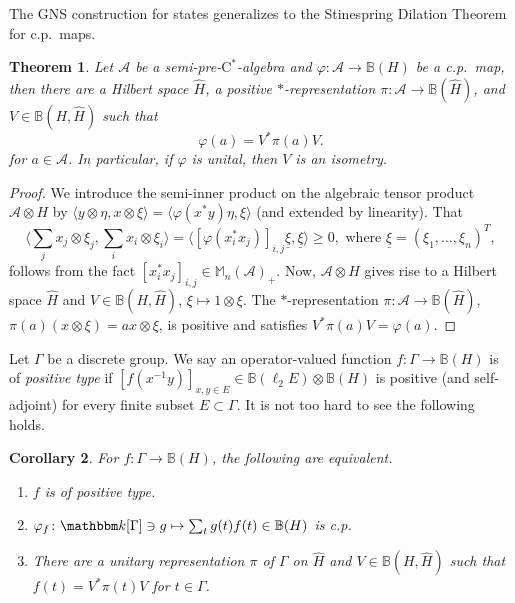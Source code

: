 \documentclass[12pt]{amsart}
\newtheorem{thm}{Theorem}
\newtheorem{cor}[thm]{Corollary}
\theoremstyle{definition}
\begin{document}
The GNS construction for states generalizes to
the Stinespring Dilation Theorem for c.p.\ maps.
\begin{thm}\label{thm:stinespring}
Let ${{\mathcal A}}$ be a {semi-pre-$\mathrm{C}^*$-alge\-bra\xspace} and
${\varphi}\colon{{\mathcal A}}\to{{\mathbb B}}({H})$ be a c.p.\ map,
then there are a Hilbert space $\hat{H}$, a positive {$*$-repre\-sen\-ta\-tion\xspace}
$\pi\colon{{\mathcal A}}\to{{\mathbb B}}(\hat{H})$, and $V\in{{\mathbb B}}({H},\hat{H})$ such that
\[
{\varphi}(a)=V^*\pi(a)V.
\]
for $a\in{{\mathcal A}}$. In particular, if ${\varphi}$ is unital, then $V$ is an isometry.
\end{thm}
\begin{proof}
We introduce the semi-inner product on the algebraic tensor product ${{\mathcal A}}\otimes{H}$
by ${\mathopen{\langle}{y\otimes\eta,x\otimes\xi}\mathclose{\rangle}}={\mathopen{\langle}{{\varphi}(x^*y)\eta,\xi}\mathclose{\rangle}}$ (and extended by linearity).
That
\[
{\mathopen{\langle}{\sum_j x_j\otimes\xi_j,\sum_i x_i\otimes\xi_i}\mathclose{\rangle}}
={\mathopen{\langle}{ [{\varphi}(x_i^*x_j)]_{i,j}\underline{\xi},\underline{\xi}}\mathclose{\rangle}}\geq0,
\mbox{ where }\underline{\xi}=(\xi_1,\ldots,\xi_n)^T,
\]
follows from the fact $[x_i^*x_j]_{i,j}\in{{\mathbb M}}_n({{\mathcal A}})_+$.
Now, ${{\mathcal A}}\otimes{H}$ gives rise to a Hilbert space $\hat{H}$
and $V\in{{\mathbb B}}({H},\hat{H})$, $\xi\mapsto1\otimes\xi$.
The {$*$-repre\-sen\-ta\-tion\xspace} $\pi\colon{{\mathcal A}}\to {{\mathbb B}}(\hat{H})$,
$\pi(a)(x\otimes\xi)=ax\otimes\xi$, is positive and satisfies $V^*\pi(a)V={\varphi}(a)$.
\end{proof}

Let ${\Gamma}$ be a discrete group. We say an operator-valued function $f\colon{\Gamma}\to{{\mathbb B}}({H})$
is of \emph{positive type} if $[f(x^{-1}y)]_{x,y\in E}\in{{\mathbb B}}(\ell_2 E)\otimes{{\mathbb B}}({H})$
is positive (and self-adjoint) for every finite subset $E\subset {\Gamma}$.
It is not too hard to see the following holds.
\begin{cor}\label{cor:posdeffunct}
For $f\colon{\Gamma}\to{{\mathbb B}}({H})$, the following are equivalent.
\begin{enumerate}[$(1)$]
\item
$f$ is of positive type.
\item
${\varphi}_f\colon {{\mathbbm k}}[{\Gamma}]\ni g\mapsto\sum_t g(t)f(t)\in{{\mathbb B}}({H})$ is c.p.
\item
There are a unitary representation $\pi$ of ${\Gamma}$ on $\hat{H}$ and
$V\in {{\mathbb B}}({H},\hat{H})$ such that $f(t)=V^*\pi(t)V$ for $t\in{\Gamma}$.
\end{enumerate}
\end{cor}
\end{document}
